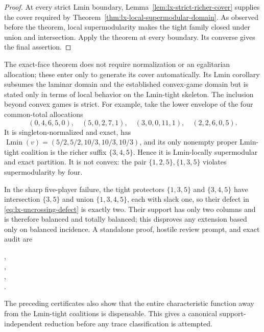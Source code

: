 \begin{proof}
At every strict Lmin boundary,
Lemma~\ref{lem:lx-strict-richer-cover} supplies the cover required by
Theorem~\ref{thm:lx-local-supermodular-domain}.  As observed before the
theorem, local supermodularity makes the tight family closed under union and
intersection.  Apply the theorem at every boundary.  Its converse gives the
final assertion.
\end{proof}

The exact-face theorem does not require normalization or an egalitarian
allocation; these enter only to generate its cover automatically.  Its Lmin
corollary subsumes the laminar domain and the established convex-game domain
but is stated only in terms of local behavior on the Lmin-tight skeleton.
The inclusion beyond convex games is strict.  For example, take
the lower envelope of the four common-total allocations
\[
 (0,4,6,5,0),\quad(5,0,2,7,1),\quad
 (3,0,0,11,1),\quad(2,2,6,0,5).
\]
It is singleton-normalized and exact, has
$\operatorname{Lmin}(v)=(5/2,5/2,10/3,10/3,10/3)$, and its only nonempty
proper Lmin-tight coalition is the richer suffix $\{3,4,5\}$.  Hence it is
Lmin-locally supermodular and exact partition.  It is not convex: the pair
$\{1,2,5\},\{1,3,5\}$ violates supermodularity by four.

In the sharp five-player failure, the tight protectors
$\{1,3,5\}$ and $\{3,4,5\}$ have intersection $\{3,5\}$ and union
$\{1,3,4,5\}$, each with slack one, so their defect in
\eqref{eq:lx-uncrossing-defect} is exactly two.  Their support has only two
columns and is therefore balanced and totally balanced; this disproves any
extension based only on balanced incidence.  A standalone proof, hostile
review prompt, and exact audit are
\begin{center}
\small{},\\[-2pt]
\small{},\\[-2pt]
\small{},\\[-2pt]
\small{}.
\end{center}

The preceding certificates also show that the entire characteristic function
away from the Lmin-tight coalitions is dispensable.  This gives a canonical
support-independent reduction before any trace classification is attempted.

